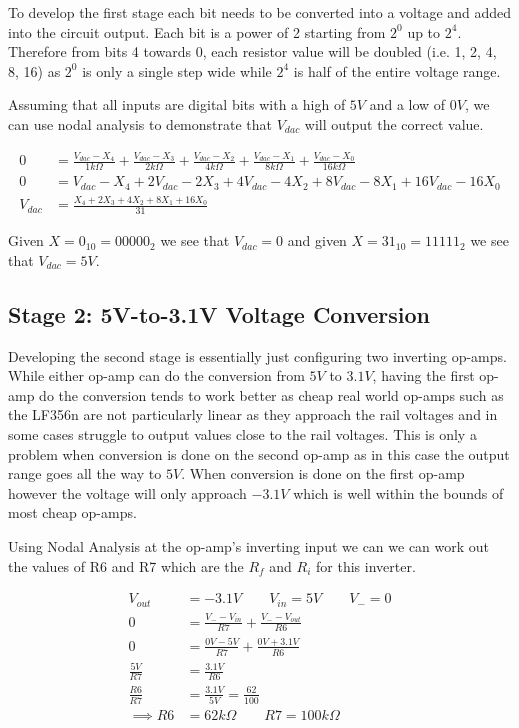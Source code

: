 \documentclass[12pt,letterpaper,titlepage]{article}
\begin{document}
\begin{raggedright}
To develop the first stage each bit needs to be converted into a voltage and added into the circuit output. Each bit is a power of 2 starting from $2^0$ up to $2^4$. Therefore from bits 4 towards 0, each resistor value will be doubled (i.e. 1, 2, 4, 8, 16) as $2^0$ is only a single step wide while $2^4$ is half of the entire voltage range.

Assuming that all inputs are digital bits with a high of $5V$ and a low of $0V$, we can use nodal analysis to demonstrate that $V_{dac}$ will output the correct value.

\begin{align*}
0 &= \frac{V_{dac} - X_4}{1k\Omega}
   + \frac{V_{dac} - X_3}{2k\Omega}
   + \frac{V_{dac} - X_2}{4k\Omega}
   + \frac{V_{dac} - X_1}{8k\Omega}
   + \frac{V_{dac} - X_0}{16k\Omega}
\\0 &= V_{dac} - X_4
   + 2V_{dac} - 2X_3
   + 4V_{dac} - 4X_2
   + 8V_{dac} - 8X_1
   + 16V_{dac} - 16X_0
\\V_{dac} &= \frac{X_4 + 2X_3 + 4X_2 + 8X_1 + 16X_0}{31}
\end{align*}

Given $X = 0_{10} = 00000_{2}$ we see that $V_{dac} = 0$ and given $X = 31_{10} = 11111_{2}$ we see that $V_{dac} = 5V$. 

\clearpage

\subsection*{Stage 2: 5V-to-3.1V Voltage Conversion}

Developing the second stage is essentially just configuring two inverting op-amps. While either op-amp can do the conversion from $5V$ to $3.1V$, having the first op-amp do the conversion tends to work better as cheap real world op-amps such as the LF356n are not particularly linear as they approach the rail voltages and in some cases struggle to output values close to the rail voltages. This is only a problem when conversion is done on the second op-amp as in this case the output range goes all the way to $5V$. When conversion is done on the first op-amp however the voltage will only approach $-3.1V$ which is well within the bounds of most cheap op-amps.

Using Nodal Analysis at the op-amp's inverting input we can we can work out the values of R6 and R7 which are the $R_f$ and $R_i$ for this inverter. 

\begin{align*}
   V_{out} &= -3.1V\qquad V_{in} = 5V\qquad V_{-} = 0
\\ 0 &= \frac{V_{-} - V_{in}}{R7} + \frac{V_{-} - V_{out}}{R6}
\\ 0 &= \frac{0V - 5V}{R7} + \frac{0V + 3.1V}{R6}
\\ \frac{5V}{R7} &= \frac{3.1V}{R6}
\\ \frac{R6}{R7} &= \frac{3.1V}{5V} = \frac{62}{100}
\\ \implies R6 &= 62k\Omega\qquad R7 = 100k\Omega
\end{align*}


\end{raggedright}
\end{document}
